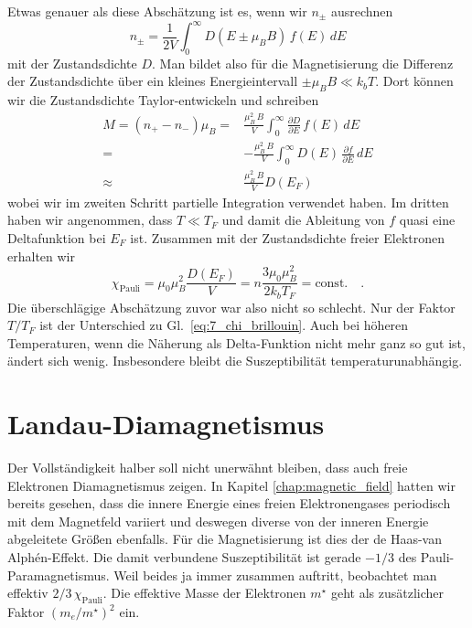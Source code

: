 Etwas genauer als diese Abschätzung ist es, wenn wir $n_\pm$ ausrechnen
\begin{equation}
    n_\pm = \frac{1}{2V} \int_0^\infty D(E \pm \mu_B B) \, f(E) \, dE
\end{equation}
mit der Zustandsdichte $D$. Man bildet also für die Magnetisierung die Differenz der Zustandsdichte über ein kleines Energieintervall $\pm \mu_B B \ll k_b T$. Dort können wir die Zustandsdichte Taylor-entwickeln und schreiben
\begin{align}
    M = (n_+ - n_-) \mu_B = & \frac{\mu_B^2 \, B}{V} \int_0^\infty \frac{\partial D}{\partial E} \, f(E) \,  dE \\
    = & - \frac{\mu_B^2 \, B}{V} \int_0^\infty D(E) \, \frac{\partial f}{\partial E} \,  dE \\
    \approx &  \frac{\mu_B^2 \, B}{V} D(E_F)
\end{align}
wobei wir im zweiten Schritt partielle Integration verwendet haben. Im dritten  haben wir angenommen, dass $T \ll T_F$ und damit die Ableitung von $f$ quasi eine Deltafunktion bei $E_F$ ist. Zusammen mit der Zustandsdichte freier Elektronen erhalten wir
\begin{equation}
    \chi_\text{Pauli} = \mu_0 \mu_B^2 \frac{D(E_F)}{V} = n \frac{3 \mu_0 \mu_B^2}{2 k_b T_F} = \text{const.}  \quad .
\end{equation}
Die überschlägige Abschätzung zuvor war also nicht so schlecht. Nur der Faktor $T/T_F$ ist der Unterschied zu Gl.~\ref{eq:7_chi_brillouin}. Auch bei höheren Temperaturen, wenn die Näherung als Delta-Funktion nicht mehr ganz so gut ist, ändert sich wenig. Insbesondere bleibt die Suszeptibilität temperaturunabhängig.


\section*{Landau-Diamagnetismus}

Der Vollständigkeit halber soll nicht unerwähnt bleiben, dass auch freie Elektronen Diamagnetismus zeigen. 
In Kapitel \ref{chap:magnetic_field}
hatten wir bereits gesehen, dass die innere Energie eines freien Elektronengases periodisch mit dem Magnetfeld variiert  und deswegen diverse von der inneren Energie abgeleitete Größen ebenfalls. Für die Magnetisierung ist dies der de Haas-van Alphén-Effekt. Die damit verbundene  Suszeptibilität ist gerade $-1/3$ des Pauli-Paramagnetismus. Weil beides ja immer zusammen auftritt, beobachtet man effektiv $2/3 \,\chi_\text{Pauli}$. Die effektive Masse der Elektronen $m^\star$ geht als zusätzlicher Faktor $(m_e /m^\star)^2$ ein.



